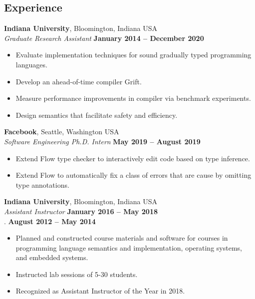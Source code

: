 \documentclass[resmargin,line]{res}
\newenvironment{list1}{
  \begin{list}{\ding{113}}{%
      \setlength{\itemsep}{0in}
      \setlength{\parsep}{0in} \setlength{\parskip}{0in}
      \setlength{\topsep}{0in} \setlength{\partopsep}{0in} 
      \setlength{\leftmargin}{0.17in}}}{\end{list}}
\begin{document}
\begin{resume}


\section{\sc Experience}
{\bf Indiana University}, Bloomington, Indiana USA\\
{\em Graduate Research Assistant} \hfill {\bf January 2014 -- December 2020}\\
%
\begin{itemize}
\vspace*{-.3cm}
\item Evaluate implementation techniques for sound gradually typed
  programming languages.
\item Develop an ahead-of-time compiler Grift.
\item Measure performance improvements in compiler via benchmark experiments.
\item Design semantics that facilitate safety and efficiency.
\end{itemize}

{\bf Facebook}, Seattle, Washington USA\\
{\em Software Engineering Ph.D. Intern} \hfill {\bf May 2019 -- August 2019}\\
%
\begin{itemize}
\vspace*{-.3cm}
\item Extend Flow type checker to interactively edit code based on type inference.
\item Extend Flow to automatically fix a class of errors that are cause by omitting
  type annotations.
\end{itemize}

{\bf Indiana University}, Bloomington, Indiana USA\\
{\em Assistant Instructor} \hfill {\bf January 2016 -- May 2018}\\
{\color{white} . } \quad \hfill {\bf August 2012 -- May 2014}\\
%
\begin{itemize}
\vspace*{-.35cm}
\item Planned and constructed course materials and software for
  courses in programming language semantics and implementation,
  operating systems, and embedded systems.
\item Instructed lab sessions of 5-30 students.
\item Recognized as Assistant Instructor of the Year in 2018.
\end{itemize}
%


\end{resume}
\end{document}
